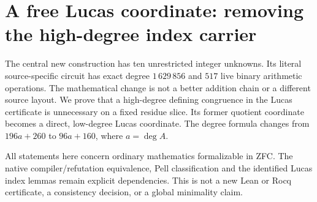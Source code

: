 \providecommand{\FreeCMainDegree}{1\,629\,856}
\providecommand{\FreeCMainOps}{517}
\providecommand{\FreeCParameterDegree}{16\,976}
\section{A free Lucas coordinate: removing the high-degree index carrier}
\label{sec:free-lucas-coordinate}

The central new construction has ten unrestricted integer unknowns.
Its literal source-specific circuit has exact degree $\FreeCMainDegree$ and
$\FreeCMainOps$ live binary arithmetic operations. The mathematical change
is not a better addition chain or a different source layout. We prove that
a high-degree defining congruence in the Lucas certificate is unnecessary
on a fixed residue slice. Its former quotient coordinate becomes a direct,
low-degree Lucas coordinate. The degree formula changes from
$196a+260$ to $96a+160$, where $a=\deg A$.

All statements here concern ordinary mathematics formalizable in ZFC.
The native compiler/refutation equivalence, Pell classification and the
identified Lucas index lemmas remain explicit dependencies. This is not a
new Lean or Rocq certificate, a consistency decision, or a global minimality
claim.

